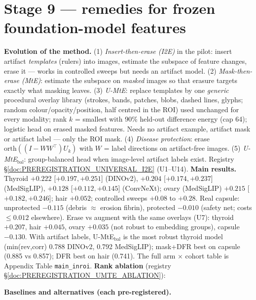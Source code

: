 \documentclass[10pt,a4paper]{article}
\begin{document}
\section{Stage 9 --- remedies for frozen foundation-model features}
\textbf{Evolution of the method.} (1) \emph{Insert-then-erase (I2E)} in the pilot: insert artifact \emph{templates}
(rulers) into images, estimate the subspace of feature changes, erase it --- works in controlled sweeps but needs an
artifact model. (2) \emph{Mask-then-erase (MtE)}: estimate the subspace on \emph{masked} images so that erasure targets
exactly what masking leaves. (3) \emph{U-MtE}: replace templates by one \emph{generic} procedural overlay library (strokes,
bands, patches, blobs, dashed lines, glyphs; random colour/opacity/position, half centred in the ROI) used unchanged for
every modality; rank $k$ = smallest with 90\% held-out difference energy (cap 64); logistic head on erased masked features.
Needs no artifact example, artifact mask or artifact label --- only the ROI mask. (4) \emph{Disease protection}: erase
$\mathrm{orth}((I-WW^\top)U_k)$ with $W$ = label directions on artifact-free images. (5) \emph{U-MtE$_{\text{bal}}$}:
group-balanced head when image-level artifact labels exist. Registry \S\ref{doc:PREREGISTRATION_UNIVERSAL_I2E} (U1--U14).
\textbf{Main results.} Thyroid $+0.222$ [$+0.197,+0.251$] (DINOv2), $+0.204$ [$+0.174,+0.237$] (MedSigLIP), $+0.128$
[$+0.112,+0.145$] (ConvNeXt); ovary (MedSigLIP) $+0.215$ [$+0.182,+0.246$]; hair $+0.052$; controlled sweeps $+0.08$ to
$+0.28$. Real capsule: unprotected $-0.115$ (debris $\approx$ erosion fibrin), protected $-0.010$ (safety net; costs $\le0.012$
elsewhere). Erase vs augment with the same overlays (U7): thyroid $+0.207$, hair $+0.045$, ovary $+0.035$ (not robust to
embedding groups), capsule $-0.130$. With artifact labels, U-MtE$_{\text{bal}}$ is the most robust thyroid model
(min(rev,corr) 0.788 DINOv2, 0.792 MedSigLIP); mask+DFR best on capsule (0.885 vs 0.857); DFR best on hair (0.741).
The full arm $\times$ cohort table is Appendix Table \texttt{main\_inroi}.
\textbf{Rank ablation} (registry \S\ref{doc:PREREGISTRATION_UMTE_ABLATION}):

\textbf{Baselines and alternatives (each pre-registered).}
\end{document}
